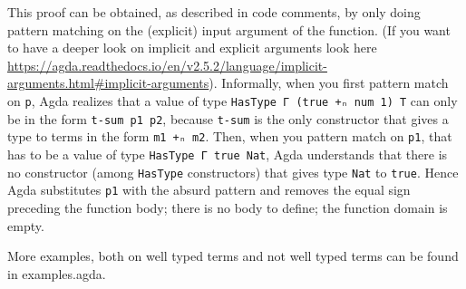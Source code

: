 \documentclass{article}
\begin{document}
This proof can be obtained, as described in code comments, by only doing pattern matching on the (explicit) input argument of the function. (If you want to have a deeper look on implicit and explicit arguments look here \url{https://agda.readthedocs.io/en/v2.5.2/language/implicit-arguments.html#implicit-arguments}).
Informally, when you first pattern match on \texttt{p}, Agda realizes that a value of type \texttt{HasType Γ (true +ₙ num 1) T} can only be in the form \texttt{t-sum p1 p2}, because \texttt{t-sum} is the only constructor that gives a type to terms in the form \texttt{m1 +ₙ m2}.
Then, when you pattern match on \texttt{p1}, that has to be a value of type \texttt{HasType Γ true Nat}, Agda understands that there is no constructor (among \texttt{HasType} constructors) that gives type \texttt{Nat} to \texttt{true}.
Hence Agda substitutes \texttt{p1} with the absurd pattern and removes the equal sign preceding the function body; there is no body to define; the function domain is empty.

\vspace{1em}
More examples, both on well typed terms and not well typed terms can be found in examples.agda.



\newpage
\nocite{*}
\printbibliography
\end{document}
